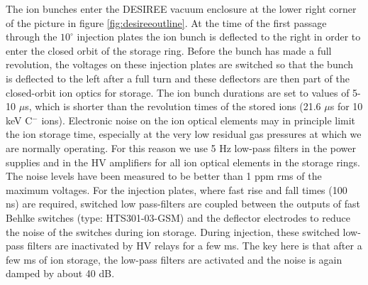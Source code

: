 \documentclass[aps,pra,preprint,superscriptaddress]{revtex4}
\begin{document}
The ion bunches enter the DESIREE vacuum enclosure at the lower right corner of the picture in figure \ref{fig:desireeoutline}. At the time of the first passage through the $10^{\circ}$ injection plates the ion bunch is deflected to the right in order to enter the closed orbit of the storage ring. Before the bunch has made a full revolution, the voltages on these injection plates are switched so that the bunch is deflected to the left after a full turn and these deflectors are then part of the closed-orbit ion optics for storage. The ion bunch durations are set to values of 5-10 $\mu$s, which is shorter than the revolution times of the stored ions (21.6 $\mu$s for 10 keV C$^-$ ions). Electronic noise on the ion optical elements may in principle limit the ion storage time, especially at the very low residual gas pressures at which we are normally operating.
For this reason we use 5 Hz low-pass filters in the power supplies and 
in the HV amplifiers for all ion optical elements in the storage rings. The noise levels have been measured to be better than 1 ppm rms of the maximum voltages. For the injection plates, where fast rise and fall times (100 ns) are required, switched low pass-filters are coupled between the outputs of fast Behlke switches (type: HTS301-03-GSM) and the deflector electrodes to reduce the noise of the switches during ion storage. During injection, these switched low-pass filters are inactivated by HV relays for a few ms. The key here is that after a few ms of ion storage, the low-pass filters are activated and the noise is again damped by about 40 dB.
\end{document}
